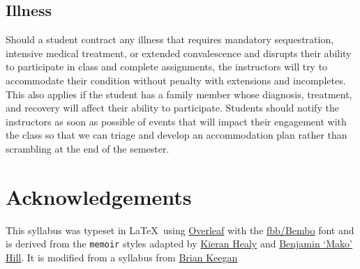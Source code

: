 \documentclass[10pt]{memoir}
\begin{document}
\subsection{Illness}
Should a student contract any illness that requires mandatory sequestration, intensive medical treatment, or extended convalescence and disrupts their ability to participate in class and complete assignments, the instructors will try to accommodate their condition without penalty with extensions and incompletes. This also applies if the student has a family member whose diagnosis, treatment, and recovery will affect their ability to participate. Students should notify the instructors as soon as possible of events that will impact their engagement with the class so that we can triage and develop an accommodation plan rather than scrambling at the end of the semester.

\section{\textbf{Acknowledgements}}

This syllabus was typeset in \LaTeX~using \href{http://www.sharelatex.com}{Overleaf} with the \href{http://www.tug.dk/FontCatalogue/fbb/}{fbb/Bembo} font and is derived from the \texttt{memoir} styles adapted by \href{https://github.com/kjhealy/latex-custom-kjh}{Kieran Healy} and \href{http://projects.mako.cc/source/?p=latex_mako;a=summary}{Benjamin `Mako' Hill}. It is modified from a syllabus from \href{https://www.brianckeegan.com/}{Brian Keegan} 



\renewcommand{\bibsection}{\section{\huge \bibname}\prebibhook}
\baselineskip 14.2pt

\end{document}
